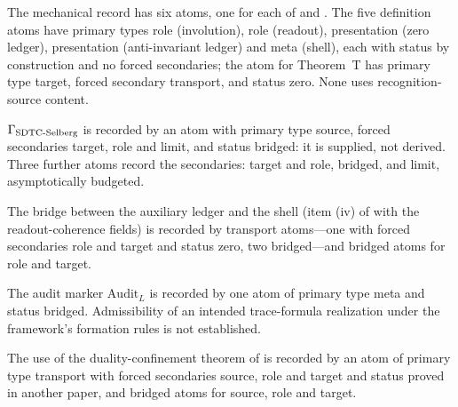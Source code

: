 \begin{classification}
\label{thm:rh:aor-mechanical-records}
The mechanical record has six atoms, one for each of
and .  The five definition atoms have
primary types role (involution), role (readout), presentation (zero
ledger), presentation (anti-invariant ledger) and meta (shell), each
with status by construction and no forced secondaries; the atom for
Theorem~T has primary type target, forced secondary transport, and
status zero.  None uses recognition-source content.
\end{classification}

\begin{classification}
\label{thm:rh:aor-recognition-discharge}
\(\Gamma_{\mathrm{SDTC\text{-}Selberg}}\) is recorded by an atom with primary type source,
forced secondaries target, role and limit, and status bridged: it is
supplied, not derived.  Three further atoms record the secondaries:
target and role, bridged, and limit, asymptotically budgeted.
\end{classification}

\begin{classification}
\label{thm:rh:aor-gamma-bridge-discharge}
The bridge between the auxiliary ledger and the shell (item (iv) of
 with the readout-coherence fields) is
recorded by transport atoms---one with forced secondaries role and
target and status zero, two bridged---and bridged atoms for role and
target.
\end{classification}

\begin{classification}
\label{thm:rh:aor-auditL-discharge}
The audit marker \(\mathrm{Audit}_L\) is recorded by one atom of
primary type meta and status bridged.  Admissibility of an intended
trace-formula realization under the framework's formation rules is not
established.
\end{classification}

\begin{classification}
\label{thm:rh:aor-dc-master-import-discharge}
The use of the duality-confinement theorem of \citet{TsiokosSDTC2026}
is recorded by an atom of primary type transport with forced
secondaries source, role and target and status proved in another
paper, and bridged atoms for source, role and target.
\end{classification}

